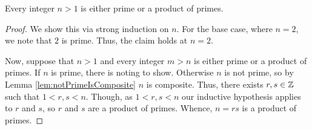 \guard





\begin{lem}
\label{lem:positiveNotUnitIntegerPrimeOrProductOfPrimes}
  Every integer $n>1$ is either prime or a product of primes.
\end{lem}
\begin{proof}
  We show this via strong induction on $n$.
  For the base case, where $n=2$, we note that $2$ is prime.
  Thus, the claim holds at $n=2$.

  Now, suppose that $n>1$ and every integer $m>n$ is either prime or a product of primes.
  If $n$ is prime, there is noting to show.
  Otherwise $n$ is not prime, so by Lemma \ref{lem:notPrimeIsComposite} $n$ is composite.
  Thus, there exists $r,s\in\mathbb{Z}$ such that $1<r,s<n$.
  Though, as $1<r,s<n$ our inductive hypothesis applies to $r$ and $s$, so $r$ and $s$ are a product of primes.
  Whence, $n=rs$ is a product of primes.
\end{proof}

